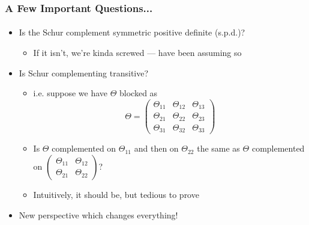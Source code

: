 \documentclass{beamer}                             %
\begin{document}
\begin{frame}
\frametitle{A Few Important Questions...}
\framesubtitle{}

\begin{itemize}
  \item<+-> Is the Schur complement symmetric positive definite (s.p.d.)?
    \begin{itemize}
      \item<+-> If it isn't, we're kinda screwed
        --- have been assuming so
    \end{itemize}
  \item<+-> Is Schur complementing transitive?
    \begin{itemize}
      \item<+-> i.e. suppose we have \( \Theta \) blocked as
        \[
          \Theta =
          \begin{pmatrix}
            \Theta_{11} & \Theta_{12} & \Theta_{13} \\
            \Theta_{21} & \Theta_{22} & \Theta_{23} \\
            \Theta_{31} & \Theta_{32} & \Theta_{33}
          \end{pmatrix}
        \]
      \item<+-> Is \( \Theta \) complemented on \( \Theta_{11} \) and then
        on \( \Theta_{22} \) the same as \( \Theta \) complemented on
        \(
          \begin{pmatrix}
            \Theta_{11} & \Theta_{12} \\
            \Theta_{21} & \Theta_{22}
          \end{pmatrix}
        \)?
      \item<+-> Intuitively, it should be, but tedious to prove
    \end{itemize}
  \item<+-> New perspective which changes everything!
\end{itemize}

\end{frame}
\end{document}
